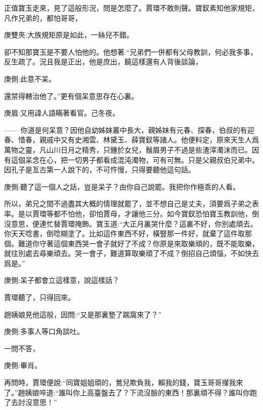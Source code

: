 \begin{parag}
    正值寶玉走來，見了這般形況，問是怎麼了。賈環不敢則聲。寶釵素知他家規矩，凡作兄弟的，都怕哥哥，\begin{note}庚雙夾:大族規矩原是如此，一絲兒不錯。\end{note}卻不知那寶玉是不要人怕他的。他想著:“兄弟們一併都有父母教訓，何必我多事，反生疏了。況且我是正出，他是庶出，饒這樣還有人背後談論，\begin{note}庚側:此意不呆。\end{note}還禁得轄治他了。”更有個呆意思存在心裏。\begin{note}庚眉:又用諱人語瞞著看官。己冬夜。\end{note}—— 你道是何呆意？因他自幼姊妹叢中長大，親姊妹有元春、探春，伯叔的有迎春、惜春，親戚中又有史湘雲、林黛玉、薛寶釵等諸人。他便料定，原來天生人爲萬物之靈，凡山川日月之精秀，只鍾於女兒，鬚眉男子不過是些渣滓濁沫而已。因有這個呆念在心，把一切男子都看成混沌濁物，可有可無。只是父親叔伯兄弟中。因孔子是亙古第一人說下的，不可忤慢，只得要聽他這句話。\begin{note}庚側:聽了這一個人之話，豈是呆子？由你自己說罷。我把你作極乖的人看。\end{note}所以，弟兄之間不過盡其大概的情理就罷了，並不想自己是丈夫，須要爲子弟之表率。是以賈環等都不怕他，卻怕賈母，才讓他三分。如今寶釵恐怕寶玉教訓他，倒沒意思，便連忙替賈環掩飾。寶玉道:“大正月裏哭什麼？這裏不好，你別處頑去。你天天唸書，倒唸糊塗了。比如這件東西不好，橫豎那一件好，就棄了這件取那個。難道你守著這個東西哭一會子就好了不成？你原是來取樂頑的，既不能取樂，就往別處去尋樂頑去。哭一會子，難道算取樂頑了不成？倒招自己煩惱，不如快去爲是。”\begin{note}庚側:呆子都會立這樣意，說這樣話？\end{note}賈環聽了，只得回來。
\end{parag}


\begin{parag}
    趙姨娘見他這般，因問:“又是那裏墊了踹窩來了？”\begin{note}庚側:多事人等口角談吐。\end{note}一問不答，\begin{note}庚側:畢肖。\end{note}再問時，賈環便說:“同寶姐姐頑的，鶯兒欺負我，賴我的錢，寶玉哥哥攆我來了。”趙姨娘啐道:“誰叫你上高臺盤去了？下流沒臉的東西！那裏頑不得？誰叫你跑了去討沒意思！”
\end{parag}


